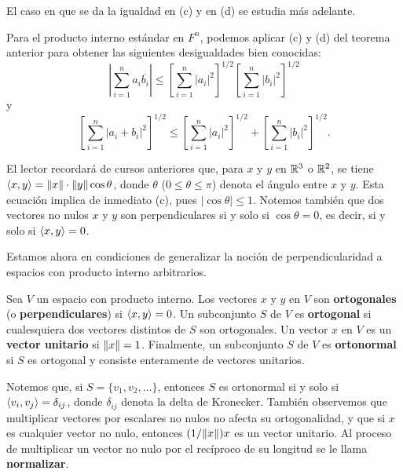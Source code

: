 \documentclass[12pt,a4paper]{book}
\begin{document}
    El caso en que se da la igualdad en (c) y en (d) se estudia más adelante.

    \begin{ejemplo}
        Para el producto interno estándar en $F^n$, podemos aplicar (c) y (d) del teorema anterior para obtener las siguientes desigualdades bien conocidas:
        \begin{equation*}
            \left|\sum_{i=1}^{n}a_i\overline{b_i}\right|\leq\left[\sum_{i=1}^{n}|a_i|^2\right]^{1/2}\left[\sum_{i=1}^{n}|b_i|^2\right]^{1/2}
        \end{equation*}
        y
        \begin{equation*}
            \left[\sum_{i=1}^{n}|a_i+b_i|^2\right]^{1/2}\leq\left[\sum_{i=1}^{n}|a_i|^2\right]^{1/2}+\left[\sum_{i=1}^{n}|b_i|^2\right]^{1/2}.
        \end{equation*}
    \end{ejemplo}

    El lector recordará de cursos anteriores que, para $x$ y $y$ en $\mathbb{R}^3$ o $\mathbb{R}^2$, se tiene $\left\langle x, y \right\rangle=\norm{x}\cdot\norm{y}\cos\theta$, donde $\theta$ ($0\leq\theta\leq\pi$) denota el ángulo entre $x$ y $y$. Esta ecuación implica de inmediato (c), pues $|\cos\theta|\leq 1$. Notemos también que dos vectores no nulos $x$ y $y$ son perpendiculares si y solo si $\cos\theta=0$, es decir, si y solo si $\left\langle x, y \right\rangle=0$.

    Estamos ahora en condiciones de generalizar la noción de perpendicularidad a espacios con producto interno arbitrarios.

    \begin{definicion}[Ortogonalidad]
        Sea $V$ un espacio con producto interno. Los vectores $x$ y $y$ en $V$ son \textbf{ortogonales} (o \textbf{perpendiculares}) si $\left\langle x, y \right\rangle=0$. Un subconjunto $S$ de $V$ es \textbf{ortogonal} si cualesquiera dos vectores distintos de $S$ son ortogonales. Un vector $x$ en $V$ es un \textbf{vector unitario} si $\norm{x}=1$. Finalmente, un subconjunto $S$ de $V$ es \textbf{ortonormal} si $S$ es ortogonal y consiste enteramente de vectores unitarios.
    \end{definicion}

    Notemos que, si $S=\{v_1,v_2,\dots\}$, entonces $S$ es ortonormal si y solo si $\left\langle v_i, v_j \right\rangle=\delta_{ij}$, donde $\delta_{ij}$ denota la delta de Kronecker. También observemos que multiplicar vectores por escalares no nulos no afecta su ortogonalidad, y que si $x$ es cualquier vector no nulo, entonces $(1/\norm{x})x$ es un vector unitario. Al proceso de multiplicar un vector no nulo por el recíproco de su longitud se le llama \textbf{normalizar}.
\end{document}
